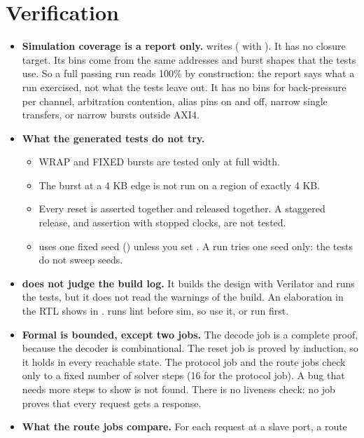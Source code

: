 \section{Verification}

\begin{itemize}
\item \textbf{Simulation coverage is a report only.}  writes
   ( with ). It has no closure target. Its bins come from the same addresses
  and burst shapes that the tests use. So a full passing run reads 100\% by construction:
  the report says what a run exercised, not what the tests leave out. It has no bins for
  back-pressure per channel, arbitration contention, alias pins on and off, narrow single
  transfers, or narrow bursts outside AXI4.
\item \textbf{What the generated tests do not try.}
  \begin{itemize}
  \item WRAP and FIXED bursts are tested only at full width.
  \item The burst at a 4 KB edge is not run on a region of exactly 4 KB.
  \item Every reset is asserted together and released together. A staggered release,
    and assertion with stopped clocks, are not tested.
  \item {} uses one fixed seed () unless you set
    . A run tries one seed only: the tests do not sweep seeds.
  \end{itemize}
\item \textbf{ does not judge the build log.} It builds the design with
  Verilator and runs the tests, but it does not read the warnings of the build. An
  elaboration  in the RTL shows in .  runs lint
  before sim, so use it, or run  first.
\item \textbf{Formal is bounded, except two jobs.} The decode job is a complete proof,
  because the decoder is combinational. The reset job is proved by induction, so it holds
  in every reachable state. The protocol job and the route jobs check only to a fixed
  number of solver steps (16 for the protocol job). A bug that needs more steps to show
  is not found. There is no liveness check: no job proves that every request gets a
  response.
\item \textbf{What the route jobs compare.} For each request at a slave port, a route

\end{itemize}
